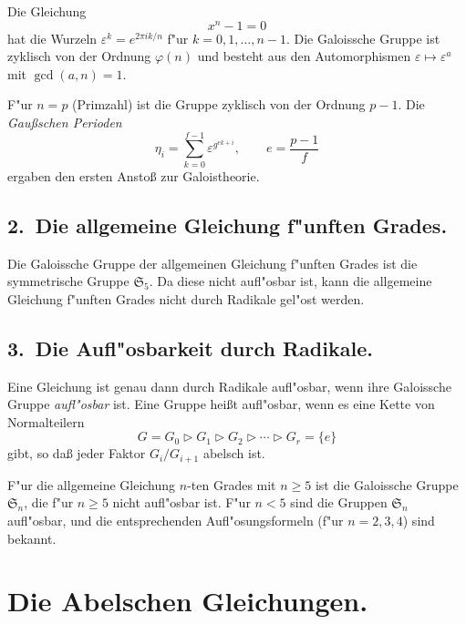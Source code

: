 \documentclass[12pt,a4paper]{article}
\theoremstyle{definition}
\begin{document}
Die Gleichung
\begin{equation}\tag{1}
x^n - 1 = 0
\end{equation}
hat die Wurzeln $\varepsilon^k = e^{2\pi ik/n}$ f"ur $k = 0,1,\ldots,n-1$. Die Galoissche Gruppe ist zyklisch von der Ordnung $\varphi(n)$ und besteht aus den Automorphismen $\varepsilon \mapsto \varepsilon^a$ mit $\gcd(a,n) = 1$.

F"ur $n = p$ (Primzahl) ist die Gruppe zyklisch von der Ordnung $p-1$. Die \emph{Gau\ss{}schen Perioden}
\begin{equation}\tag{2}
\eta_i = \sum_{k=0}^{f-1} \varepsilon^{g^{ek+i}},\qquad e = \frac{p-1}{f}
\end{equation}
ergaben den ersten Ansto\ss{} zur Galoistheorie.

\subsection*{2.~Die allgemeine Gleichung f"unften Grades.}

Die Galoissche Gruppe der allgemeinen Gleichung f"unften Grades ist die symmetrische Gruppe $\mathfrak{S}_5$. Da diese nicht aufl"osbar ist, kann die allgemeine Gleichung f"unften Grades nicht durch Radikale gel"ost werden.

\newpage

\subsection*{3.~Die Aufl"osbarkeit durch Radikale.}

Eine Gleichung ist genau dann durch Radikale aufl"osbar, wenn ihre Galoissche Gruppe \emph{aufl"osbar} ist. Eine Gruppe hei\ss{}t aufl"osbar, wenn es eine Kette von Normalteilern
\[G = G_0 \vartriangleright G_1 \vartriangleright G_2 \vartriangleright \cdots \vartriangleright G_r = \{e\}
\]
gibt, so da\ss{}{} jeder Faktor $G_i/G_{i+1}$ abelsch ist.

F"ur die allgemeine Gleichung $n$-ten Grades mit $n \geq 5$ ist die Galoissche Gruppe $\mathfrak{S}_n$, die f"ur $n \geq 5$ nicht aufl"osbar ist. F"ur $n < 5$ sind die Gruppen $\mathfrak{S}_n$ aufl"osbar, und die entsprechenden Aufl"osungsformeln (f"ur $n=2,3,4$) sind bekannt.

\section{Die Abelschen Gleichungen.}
\end{document}
